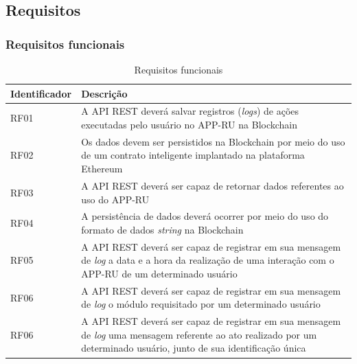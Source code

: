 \subsection{Requisitos}

\subsubsection{Requisitos funcionais}
\begin{table}[H]
    \centering
    \begin{tabular}{ | p{3cm} | p{10cm} |}
        \hline
        \textbf{Identificador} & \textbf{Descrição}\\
        \hline

        RF01 & A API REST deverá salvar registros (\emph{logs}) de ações executadas pelo usuário no APP-RU na Blockchain  \\
        \hline
        
        RF02 & Os dados devem ser persistidos na Blockchain por meio do uso de um contrato inteligente implantado na plataforma Ethereum \\
        \hline

        RF03 & A API REST deverá ser capaz de retornar dados referentes ao uso do APP-RU \\
        \hline

        RF04 & A persistência de dados deverá ocorrer por meio do uso do formato de dados \emph{string} na Blockchain \\
        \hline

        RF05 & A API REST deverá ser capaz de registrar em sua mensagem de \emph{log} a data e a hora da realização de uma interação com o APP-RU de um determinado usuário \\
        \hline

        RF06 & A API REST deverá ser capaz de registrar em sua mensagem de \emph{log} o módulo requisitado por um determinado usuário \\
        \hline

        RF06 & A API REST deverá ser capaz de registrar em sua mensagem de \emph{log} uma mensagem referente ao ato realizado por um determinado usuário, junto de sua identificação única \\
        \hline

    \end{tabular}
    \caption{Requisitos funcionais}
    \label{tab:my_label}
\end{table}

